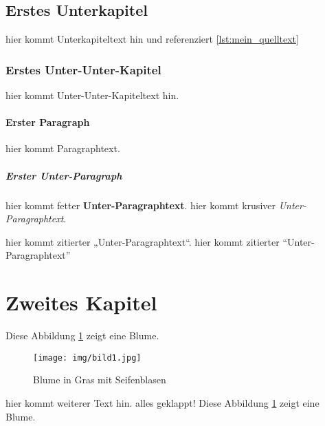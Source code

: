 \documentclass[11pt]{article}
\begin{document}
\subsection{Erstes Unterkapitel}
hier kommt Unterkapiteltext hin und referenziert \ref{lst:mein_quelltext}

\subsubsection{Erstes Unter-Unter-Kapitel}
hier kommt Unter-Unter-Kapiteltext hin.

\paragraph{Erster Paragraph}
hier kommt Paragraphtext.

\subparagraph{Erster Unter-Paragraph}
hier kommt fetter \textbf{Unter-Paragraphtext}.
hier kommt krusiver \textit{Unter-Paragraphtext}.

hier kommt zitierter „Unter-Paragraphtext“. 
hier kommt zitierter \enquote{Unter-Paragraphtext}
\newpage
\section{Zweites Kapitel}

Diese Abbildung \ref{fig: Blume} zeigt eine Blume.

\begin{figure}[H]
    \centering
    \texttt{[image: img/bild1.jpg]}
    \caption[Blume]{Blume in Gras mit Seifenblasen}
    \label{fig: Blume}
\end{figure}
hier kommt weiterer Text hin.
alles geklappt!
Diese Abbildung \ref{fig: Blume} zeigt eine Blume.
\end{document}
